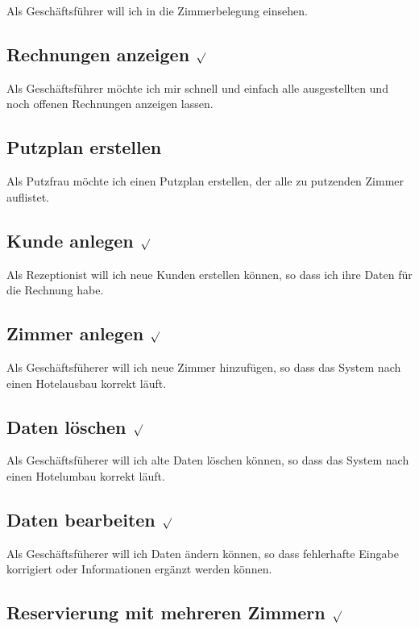 \documentclass[11pt]{scrartcl}
\begin{document}
Als Geschäftsführer will ich in die Zimmerbelegung einsehen.

\subsection{Rechnungen anzeigen $\surd$}

Als Geschäftsführer möchte ich mir schnell und einfach alle ausgestellten und noch offenen Rechnungen anzeigen lassen.

\subsection{Putzplan erstellen}

Als Putzfrau möchte ich einen Putzplan erstellen, der alle zu putzenden Zimmer auflistet.

\subsection{Kunde anlegen $\surd$}

Als Rezeptionist will ich neue Kunden erstellen können, so dass ich ihre Daten für die Rechnung habe.

\subsection{Zimmer anlegen $\surd$}

Als Geschäftsfüherer will ich neue Zimmer hinzufügen, so dass das System nach einen Hotelausbau korrekt läuft.

\subsection{Daten löschen $\surd$}

Als Geschäftsfüherer will ich alte Daten löschen können, so dass das System nach einen Hotelumbau korrekt läuft.

\subsection{Daten bearbeiten $\surd$}

Als Geschäftsfüherer will ich Daten ändern können, so dass fehlerhafte Eingabe korrigiert oder Informationen ergänzt werden können.

\subsection{Reservierung mit mehreren Zimmern $\surd$}
\end{document}
